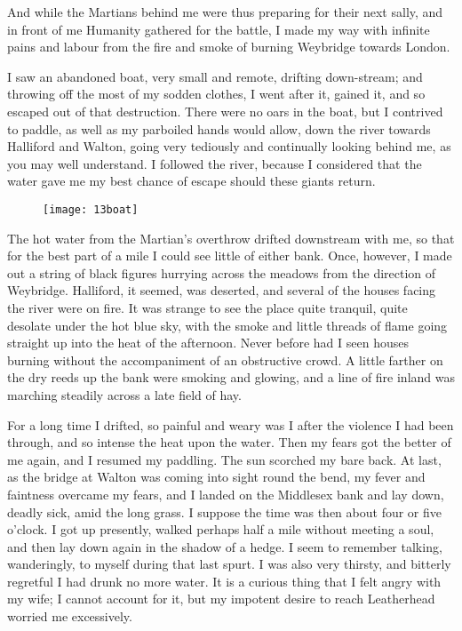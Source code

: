 And while the Martians behind me were thus preparing for their next sally, and in front of me Humanity gathered for the battle, I made my way with infinite pains and labour from the fire and smoke of burning Weybridge towards London.

I saw an abandoned boat, very small and remote, drifting down-stream; and throwing off the most of my sodden clothes, I went after it, gained it, and so escaped out of that destruction. There were no oars in the boat, but I contrived to paddle, as well as my parboiled hands would allow, down the river towards Halliford and Walton, going very tediously and continually looking behind me, as you may well understand. I followed the river, because I considered that the water gave me my best chance of escape should these giants return.


\begin{figure}[tb]
\centering
\texttt{[image: 13boat]}
\end{figure}

The hot water from the Martian's overthrow drifted downstream with me, so that for the best part of a mile I could see little of either bank. Once, however, I made out a string of black figures hurrying across the meadows from the direction of Weybridge. Halliford, it seemed, was deserted, and several of the houses facing the river were on fire. It was strange to see the place quite tranquil, quite desolate under the hot blue sky, with the smoke and little threads of flame going straight up into the heat of the afternoon. Never before had I seen houses burning without the accompaniment of an obstructive crowd. A little farther on the dry reeds up the bank were smoking and glowing, and a line of fire inland was marching steadily across a late field of hay.

For a long time I drifted, so painful and weary was I after the violence I had been through, and so intense the heat upon the water. Then my fears got the better of me again, and I resumed my paddling. The sun scorched my bare back. At last, as the bridge at Walton was coming into sight round the bend, my fever and faintness overcame my fears, and I landed on the Middlesex bank and lay down, deadly sick, amid the long grass. I suppose the time was then about four or five o'clock. I got up presently, walked perhaps half a mile without meeting a soul, and then lay down again in the shadow of a hedge. I seem to remember talking, wanderingly, to myself during that last spurt. I was also very thirsty, and bitterly regretful I had drunk no more water. It is a curious thing that I felt angry with my wife; I cannot account for it, but my impotent desire to reach Leatherhead worried me excessively.

